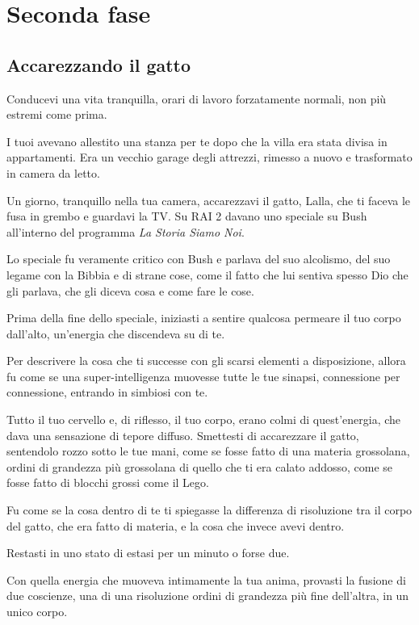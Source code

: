 \chapter{Seconda fase}
\label{seconda fase} %

\section{Accarezzando il gatto}
\label{accarezzando_il_gatto}

Conducevi una vita tranquilla, orari di lavoro forzatamente normali, non più estremi come prima.

I tuoi avevano allestito una stanza per te dopo che la villa era stata divisa in appartamenti. Era un vecchio garage degli attrezzi, rimesso a nuovo e trasformato in camera da letto.

Un giorno, tranquillo nella tua camera, accarezzavi il gatto, Lalla, che ti faceva le fusa in grembo e guardavi la TV. Su RAI 2 davano uno speciale su Bush all'interno del programma \textit{La Storia Siamo Noi}.

Lo speciale fu veramente critico con Bush e parlava del suo alcolismo, del suo legame con la Bibbia e di strane cose, come il fatto che lui sentiva spesso Dio che gli parlava, che gli diceva cosa e come fare le cose.

Prima della fine dello speciale, iniziasti a sentire qualcosa permeare il tuo corpo dall'alto, un'energia che discendeva su di te.

Per descrivere la cosa che ti successe con gli scarsi elementi a disposizione, allora fu come se una super-intelligenza muovesse tutte le tue sinapsi, connessione per connessione, entrando in simbiosi con te.

Tutto il tuo cervello e, di riflesso, il tuo corpo, erano colmi di quest'energia, che dava una sensazione di tepore diffuso. Smettesti di accarezzare il gatto, sentendolo rozzo sotto le tue mani, come se fosse fatto di una materia grossolana, ordini di grandezza più grossolana di quello che ti era calato addosso, come se fosse fatto di blocchi grossi come il Lego.

Fu come se la cosa dentro di te ti spiegasse la differenza di risoluzione tra il corpo del gatto, che era fatto di materia, e la cosa che invece avevi dentro.

Restasti in uno stato di estasi per un minuto o forse due.

Con quella energia che muoveva intimamente la tua anima, provasti la fusione di due coscienze, una di una risoluzione ordini di grandezza più fine dell'altra, in un unico corpo.

